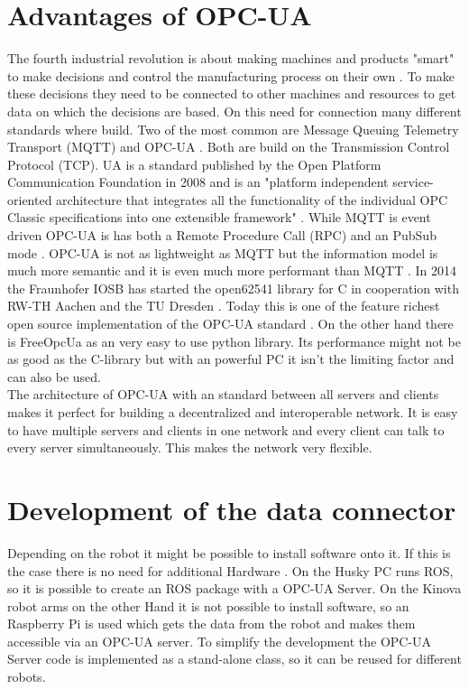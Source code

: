 \documentclass[conference]{IEEEtran}
\begin{document}
\section{Advantages of OPC-UA}
The fourth industrial revolution is about making machines and products "smart" to make decisions and control the manufacturing process on their own \cite{Industry4}.
To make these decisions they need to be connected to other machines and resources to get data on which the decisions are based.
On this need for connection many different standards where build.
Two of the most common are Message Queuing Telemetry Transport (MQTT) and OPC-UA \cite{CommTechnology}.
Both are build on the Transmission Control Protocol (TCP).
UA is a standard published by the Open Platform Communication Foundation in 2008 and is an "platform independent service-oriented architecture that integrates all the functionality of the individual OPC Classic specifications into one extensible framework" \cite{OPCUA}.
While MQTT is event driven OPC-UA is has both a Remote Procedure Call (RPC) and an PubSub mode \cite{OPCUA}. 
OPC-UA is not as lightweight as MQTT but the information model is much more semantic and it is even much more performant than MQTT \cite{CommunicationCommarison}.
In 2014 the Fraunhofer IOSB has started the open62541 library for C in cooperation with RW-TH Aachen and the TU Dresden \cite{open62541}.
Today this is one of the feature richest open source implementation of the OPC-UA standard \cite{ComparOPCUAPaper}.
On the other hand there is FreeOpcUa as an very easy to use python library.
Its performance might not be as good as the C-library but with an powerful PC it isn't the limiting factor and can also be used.\\
The architecture of OPC-UA with an standard between all servers and clients makes it perfect for building a decentralized and interoperable network.
It is easy to have multiple servers and clients in one network and every client can talk to every server simultaneously.
This makes the network very flexible.
\section{Development of the data connector}
Depending on the robot it might be possible to install software onto it.
If this is the case there is no need for additional Hardware .
On the Husky PC runs ROS, so it is possible to create an ROS package with a OPC-UA Server.
On the Kinova robot arms on the other Hand it is not possible to install software, so an Raspberry Pi is used which gets the data from the robot and makes them accessible via an OPC-UA server.
To simplify the development the OPC-UA Server code is implemented as a stand-alone class, so it can be reused for different robots.
\end{document}
